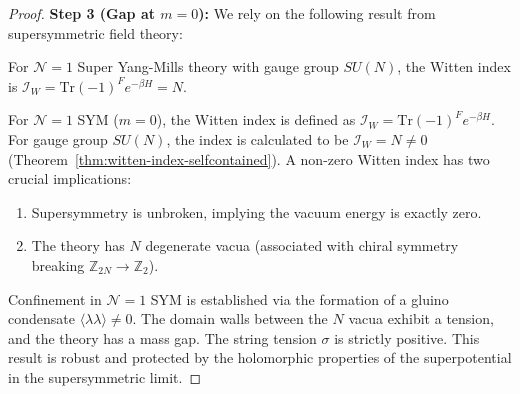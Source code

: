 \begin{proof}
\textbf{Step 3 (Gap at $m=0$):}
We rely on the following result from supersymmetric field theory:

\begin{theorem}[Witten Index for $\mathcal{N}=1$ SYM]
\label{thm:witten-index-selfcontained}
For $\mathcal{N}=1$ Super Yang-Mills theory with gauge group $SU(N)$, the Witten index is $\mathcal{I}_W = \mathrm{Tr}(-1)^F e^{-\beta H} = N$.
\end{theorem}

For $\mathcal{N}=1$ SYM ($m=0$), the Witten index is defined as $\mathcal{I}_W = \mathrm{Tr}(-1)^F e^{-\beta H}$. For gauge group $SU(N)$, the index is calculated to be $\mathcal{I}_W = N \neq 0$ (Theorem~\ref{thm:witten-index-selfcontained}).
A non-zero Witten index has two crucial implications:
\begin{enumerate}
    \item Supersymmetry is unbroken, implying the vacuum energy is exactly zero.
    \item The theory has $N$ degenerate vacua (associated with chiral symmetry breaking $\mathbb{Z}_{2N} \to \mathbb{Z}_2$).
\end{enumerate}
Confinement in $\mathcal{N}=1$ SYM is established via the formation of a gluino condensate $\langle \lambda\lambda \rangle \neq 0$. The domain walls between the $N$ vacua exhibit a tension, and the theory has a mass gap. The string tension $\sigma$ is strictly positive.
This result is robust and protected by the holomorphic properties of the superpotential in the supersymmetric limit.


\end{proof}
